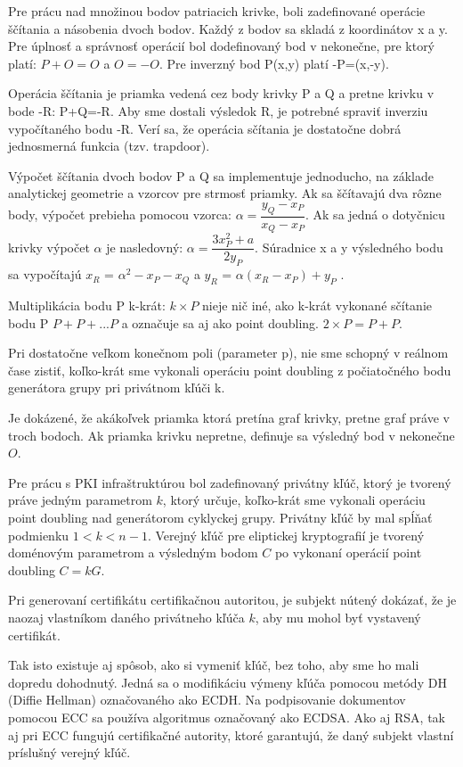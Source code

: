 \documentclass[12pt,a4wide,oneside,openright]{report}
\begin{document}
Pre prácu nad množinou bodov patriacich krivke, boli zadefinované operácie ščítania a násobenia dvoch bodov. Každý z bodov sa skladá z  koordinátov x a y. Pre úplnosť a správnosť operácií bol dodefinovaný bod v nekonečne, pre ktorý platí: $P+O=O$ a $O=-O$.
Pre inverzný bod P(x,y) platí -P=(x,-y).

Operácia ščítania je priamka vedená cez body krivky P a Q a  pretne krivku v bode -R: P+Q=-R. Aby sme dostali výsledok R, je potrebné spraviť inverziu vypočítaného bodu -R. Verí sa, že operácia sčítania je dostatočne dobrá jednosmerná funkcia (tzv. trapdoor).

Výpočet ščítania dvoch bodov P a Q sa implementuje jednoducho, na základe analytickej geometrie a vzorcov pre strmosť priamky.
Ak sa ščítavajú dva rôzne body, výpočet prebieha pomocou vzorca: $\alpha = \dfrac{ y_{Q}-x_{P}}{x_{Q}-x_{P}}$. Ak sa jedná o dotyčnicu krivky výpočet $\alpha$ je nasledovný: $\alpha = \dfrac{3x_{P}^2 + a}{2y_{P}}$. Súradnice x a y výsledného bodu sa vypočítajú
$x_{R}$ = $\alpha ^2 - x_{P} - x_{Q}$ a 
$y_{R}$ = $\alpha (x_{R} - x_{P}) + y_{P}$ \cite{ecclesson}.

Multiplikácia bodu P k-krát: $k\times P$ nieje nič iné, ako k-krát vykonané sčítanie bodu P $P+P+...P$ a označuje sa aj ako point doubling. $2\times P = P+P$\cite{ecclesson}.

Pri dostatočne veľkom konečnom poli (parameter p), nie sme schopný v reálnom čase zistiť, koľko-krát sme vykonali operáciu point doubling z počiatočného bodu generátora grupy pri privátnom kľúči k.

Je dokázené, že akákoľvek priamka ktorá pretína graf krivky, pretne graf práve v troch bodoch. Ak priamka krivku nepretne, definuje sa výsledný bod v nekonečne $O$.

Pre prácu s PKI infraštruktúrou bol zadefinovaný privátny kľúč, ktorý je tvorený práve jedným parametrom $k$, ktorý určuje, koľko-krát sme vykonali operáciu point doubling nad generátorom cyklyckej grupy. Privátny kľúč by mal spĺňať podmienku $1<k<n-1$. Verejný kľúč pre eliptickej kryptografií je tvorený doménovým parametrom a výsledným bodom $C$ po vykonaní operácií point doubling $C=kG$.

Pri generovaní certifikátu certifikačnou autoritou, je subjekt nútený dokázať, že je naozaj vlastníkom daného privátneho kľúča $k$, aby mu mohol byť vystavený certifikát\cite{ecclesson}.

Tak isto existuje aj spôsob, ako si vymeniť kľúč, bez toho, aby sme ho mali dopredu dohodnutý. Jedná sa o modifikáciu výmeny kľúča pomocou metódy DH (Diffie Hellman) označovaného ako ECDH. Na podpisovanie dokumentov pomocou ECC sa používa algoritmus označovaný ako ECDSA. Ako aj RSA, tak aj pri ECC fungujú certifikačné autority, ktoré garantujú, že daný subjekt vlastní príslušný verejný kľúč\cite{ecclesson}.
\end{document}
